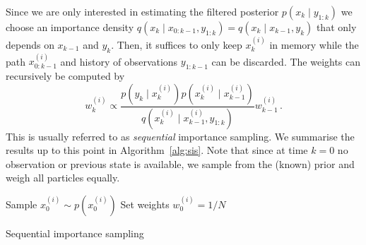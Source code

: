 Since we are only interested in estimating the filtered posterior
$p(x_k \mid y_{1:k})$ we choose an importance density
$q(x_k \mid x_{0:k-1}, y_{1:k}) = q(x_k \mid x_{k-1}, y_{k})$ that
only depends on $x_{k-1}$ and $y_k$. Then, it suffices to only keep
$x_k^{(i)}$ in memory while the path $x_{0:k-1}^{(i)}$ and history of
observations $y_{1:k-1}$ can be discarded. The weights can recursively
be computed by
\begin{equation}
  \label{eq:weight_update}
  w_k^{(i)} \propto \frac{p(y_k \mid x_k^{(i)}) p(x_k^{(i)} \mid
    x_{k-1}^{(i)})}{q(x_k^{(i)} \mid x_{k-1}^{(i)}, y_{1:k})}
  w^{(i)}_{k-1} \,.
\end{equation}
This is usually referred to as \emph{sequential} importance sampling.
We summarise the results up to this point in Algorithm~\ref{alg:sis}.
Note that since at time $k = 0$ no observation or previous state is
available, we sample from the (known) prior and weigh all particles
equally.
\begin{algorithm}[t]
  \SetAlgoLined {}
  Sample $x_0^{(i)} \sim p(x_0^{(i)})$ \;
  Set weights $w_0^{(i)} = 1/N$\;
  \caption{Sequential importance sampling}\label{alg:sis}
\end{algorithm}

